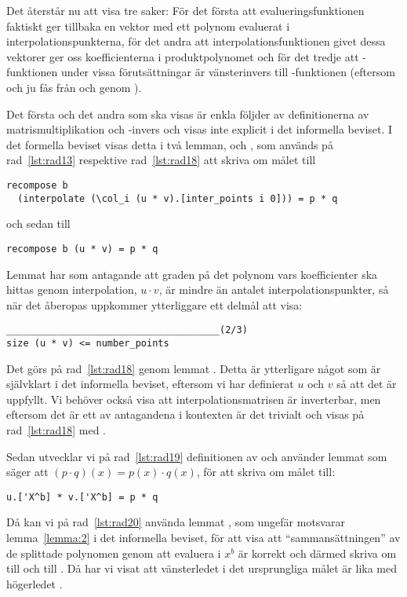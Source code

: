 Det återstår nu att visa tre saker: För det första att evalueringsfunktionen
 faktiskt ger tillbaka en vektor med ett polynom evaluerat i
interpolationspunkterna, för det andra att interpolationsfunktionen
 givet dessa vektorer ger oss koefficienterna i produktpolynomet
 och för det tredje att -funktionen under vissa
förutsättningar är vänsterinvers till -funktionen (eftersom  och
 ju fås från  och  genom ).

Det första och det andra som ska visas är enkla följder av definitionerna av
matrismultiplikation och -invers och visas inte explicit i det informella
beviset. I det formella beviset visas detta i två lemman, 
och , som används på rad~\ref{lst:rad13} respektive
rad~\ref{lst:rad18} att skriva om målet till
\begin{lstlisting}
recompose b
  (interpolate (\col_i (u * v).[inter_points i 0])) = p * q
\end{lstlisting}
och sedan till
\begin{lstlisting}
recompose b (u * v) = p * q
\end{lstlisting}
Lemmat  har som antagande att graden på det polynom vars
koefficienter ska hittas genom interpolation, $u \cdot v$, är mindre än antalet
interpolationspunkter, så när det åberopas uppkommer ytterliggare ett delmål
att visa:
\begin{lstlisting}
______________________________________(2/3)
size (u * v) <= number_points
\end{lstlisting}
Det görs på rad~\ref{lst:rad18} genom lemmat . Detta är
ytterligare något som är självklart i det informella beviset, eftersom vi har
definierat $u$ och $v$ så att det är uppfyllt. Vi behöver också visa att
interpolationsmatrisen  är inverterbar, men eftersom det är ett av
antagandena i kontexten är det trivialt och visas på rad~\ref{lst:rad18} med
\C{//}.

Sedan utvecklar vi på rad~\ref{lst:rad19} definitionen av  och använder
lemmat  som säger att $(p \cdot q)(x) = p(x) \cdot q(x)$, för att
skriva om målet till:
\begin{lstlisting}
u.['X^b] * v.['X^b] = p * q
\end{lstlisting}
Då kan vi på rad~\ref{lst:rad20} använda lemmat , som ungefär
motsvarar lemma~\ref{lemma:2} i det informella beviset, för att visa att
``sammansättningen'' av de splittade polynomen genom att evaluera i $x^b$ är
korrekt och därmed skriva om  till  och  till
. Då har vi visat att vänsterledet i det ursprungliga målet är lika med
högerledet .

